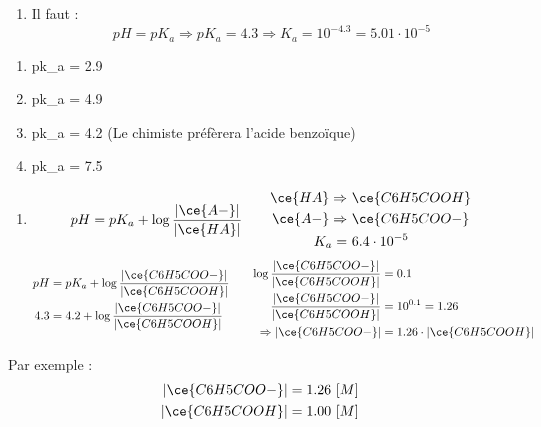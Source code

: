 \documentclass[
  11pt,
  a4paper,
  openany]{book}
\providecommand{\tightlist}{%
  \setlength{\itemsep}{0pt}\setlength{\parskip}{0pt}}
\begin{document}
\begin{Answer}

\begin{enumerate}
\def\labelenumi{\arabic{enumi}.}
\tightlist
\item
  Il faut :
  \[
  pH = pK_a \Rightarrow pK_a = 4.3 \Rightarrow K_a = 10^{-4.3} = 5.01 \cdot 10^{-5}
  \]
\end{enumerate}

\begin{enumerate}
\def\labelenumi{\alph{enumi}.}
\tightlist
\item
  pk\_a = 2.9
\item
  pk\_a = 4.9
\item
  pk\_a = 4.2 (Le chimiste préfèrera l'acide benzoïque)
\item
  pk\_a = 7.5
\end{enumerate}

\begin{enumerate}
\def\labelenumi{\arabic{enumi}.}
\setcounter{enumi}{1}
\tightlist
\item
  \[
  \begin{split}
    pH = pK_a + \log \frac{|\ce{A-}|}{|\ce{HA}|}
  \end{split}
  \qquad
  \begin{split}
    \ce{HA} \Rightarrow &\ \ce{C6H5COOH} \\
    \ce{A-} \Rightarrow &\ \ce{C6H5COO-} \\
    K_a = &\ 6.4 \cdot 10^{-5}
  \end{split}
  \]
  \[
  \begin{split}
    pH &= pK_a + \log \frac{|\ce{C6H5COO-}|}{|\ce{C6H5COOH}|} \\
    4.3 &= 4.2 + \log \frac{|\ce{C6H5COO-}|}{|\ce{C6H5COOH}|}
  \end{split}
  \qquad
  \begin{split}
    \log \frac{|\ce{C6H5COO-}|}{|\ce{C6H5COOH}|} &= 0.1 \\
    \frac{|\ce{C6H5COO-}|}{|\ce{C6H5COOH}|} &= 10^{0.1} = 1.26 \\
    \Rightarrow |\ce{C6H5COO-}| &= 1.26 \cdot |\ce{C6H5COOH}|
  \end{split}
  \]
\end{enumerate}

Par exemple :
\[
\begin{split}
|\ce{C6H5COO-}| &= 1.26\ [M] \\
|\ce{C6H5COOH}| &= 1.00\ [M]
\end{split}
\]

\end{Answer}
\end{document}
